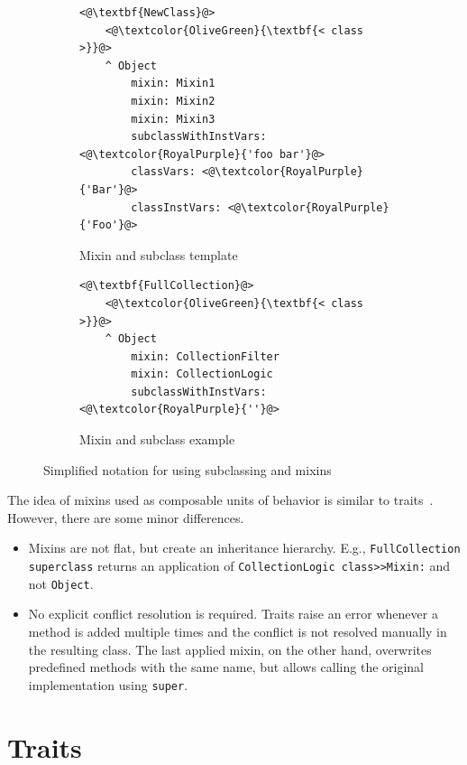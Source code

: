 \begin{figure}[!htp]
\begin{subfigure}[b]{0.45\textwidth}
\begin{lstlisting}
<@\textbf{NewClass}@>
    <@\textcolor{OliveGreen}{\textbf{< class >}}@>
    ^ Object
        mixin: Mixin1
        mixin: Mixin2
        mixin: Mixin3
        subclassWithInstVars: <@\textcolor{RoyalPurple}{'foo bar'}@>
        classVars: <@\textcolor{RoyalPurple}{'Bar'}@>
        classInstVars: <@\textcolor{RoyalPurple}{'Foo'}@>
\end{lstlisting}
\caption{Mixin and subclass template}
\end{subfigure}
\qquad
\begin{subfigure}[b]{0.45\textwidth}
\begin{lstlisting}
<@\textbf{FullCollection}@>
    <@\textcolor{OliveGreen}{\textbf{< class >}}@>
    ^ Object
        mixin: CollectionFilter
        mixin: CollectionLogic
        subclassWithInstVars: <@\textcolor{RoyalPurple}{''}@>
\end{lstlisting}
\caption{Mixin and subclass example}
\end{subfigure}
\caption{Simplified notation for using subclassing and mixins}
\label{fig:usecase_subcl_mixin}
\end{figure}

The idea of mixins used as composable units of behavior is similar to traits~\cite{traitsschaerli}. However, there are some minor differences.
\begin{itemize}
    \item Mixins are not flat, but create an inheritance hierarchy. E.g., \texttt{FullCollection superclass} returns an application of \texttt{CollectionLogic class>>Mixin:} and not \texttt{Object}.
    \item No explicit conflict resolution is required. Traits raise an error whenever a method is added multiple times and the conflict is not resolved manually in the resulting class. The last applied mixin, on the other hand, overwrites predefined methods with the same name, but allows calling the original implementation using \texttt{super}.
\end{itemize}


\section{Traits}

